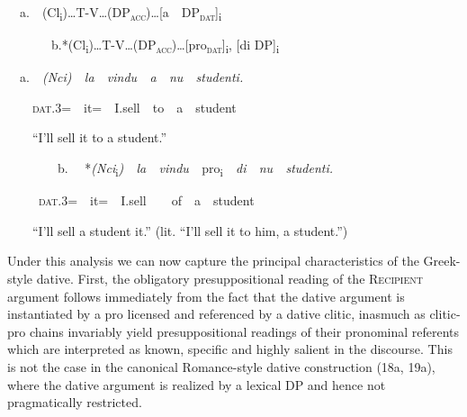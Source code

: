 \documentclass[output=paper,modfonts,nonflat]{langsci/langscibook}
\begin{document}
\begin{listWWNumviiileveli}
\item 
\begin{styleListParagraph}
\ \ a.\ \ (Cl\textsubscript{i})…T-V…(DP\textsc{\textsubscript{acc}}\textsc{)}…[a\ \ DP\textsc{\textsubscript{dat}}]\textsubscript{i}
\end{styleListParagraph}
\end{listWWNumviiileveli}
\begin{styleStandard}
\ \ \ \ \ \ \ b.*(Cl\textsubscript{i})…T-V…(DP\textsc{\textsubscript{acc}}\textsc{)}…[pro\textsc{\textsubscript{dat}}]\textsubscript{i}, [di DP]\textsubscript{i}
\end{styleStandard}

\begin{listWWNumviiileveli}
\item 
\begin{styleListParagraph}
\ \ a.\ \ \textit{(Nci)\ \ la\ \ vindu\ \ a\ \ nu\ \ studenti.}
\end{styleListParagraph}
\end{listWWNumviiileveli}
\begin{styleesempi}
\ \ \ \ \textsc{dat}.3=\ \ it=\ \ I.sell\ \ to\ \ a\ \ student
\end{styleesempi}

\begin{styleesempi}
\ \ \ \ “I’ll sell it to a student.”
\end{styleesempi}

\begin{styleStandard}
\ \ \ \ \ \ \ \ b. \ \ *\textit{(Nci}\textsubscript{i}\textit{)\ \ la\ \ vindu\ \ }pro\textsubscript{i}\textit{\ \ di\ \ nu\ \ studenti.}
\end{styleStandard}

\begin{styleesempi}
\ \ \ \  \ \textsc{dat}.3=\ \ it=\ \ I.sell\ \ \ \ of\ \ a\ \ student
\end{styleesempi}

\begin{styleesempi}
\ \ \ \ “I’ll sell a student it.” (lit. “I’ll sell it to him, a student.”)
\end{styleesempi}

\begin{styleStandard}
Under this analysis we can now capture the principal characteristics of the Greek-style dative. First, the obligatory presuppositional reading of the \textsc{Recipient} argument follows immediately from the fact that the dative argument is instantiated by a pro licensed and referenced by a dative clitic, inasmuch as clitic-pro chains invariably yield presuppositional readings of their pronominal referents which are interpreted as known, specific and highly salient in the discourse. This is not the case in the canonical Romance-style dative construction (18a, 19a), where the dative argument is realized by a lexical DP and hence not pragmatically restricted.
\end{styleStandard}
\end{document}
